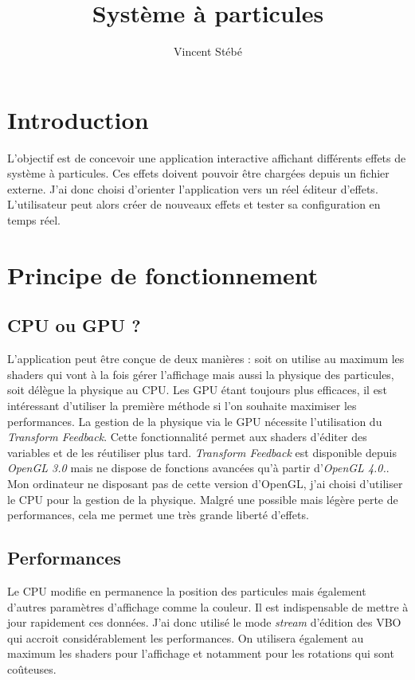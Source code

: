 \documentclass[a4paper,10pt]{article}
\title{Système à particules}
\author{Vincent Stébé}
\date{}
\begin{document}
\maketitle

\tableofcontents
\newpage
\section{Introduction}
L'objectif est de concevoir une application interactive affichant différents effets de système à particules.
Ces effets doivent pouvoir être chargées depuis un fichier externe.
J'ai donc choisi d'orienter l'application vers un réel éditeur d'effets.
L'utilisateur peut alors créer de nouveaux effets et tester sa configuration en temps réel.

\section{Principe de fonctionnement}
\subsection{CPU ou GPU ?}
L'application peut être conçue de deux manières : soit on utilise au maximum les shaders qui vont à la fois gérer l'affichage mais aussi la physique des particules,
soit délègue la physique au CPU. Les GPU étant toujours plus efficaces, il est intéressant d'utiliser la première méthode si l'on souhaite maximiser les performances.
La gestion de la physique via le GPU nécessite l'utilisation du \emph{Transform Feedback}.
Cette fonctionnalité permet aux shaders d'éditer des variables et de les réutiliser plus tard.
\emph{Transform Feedback} est disponible depuis \emph{OpenGL 3.0} mais ne dispose de fonctions avancées qu'à partir d'\emph{OpenGL 4.0.}.
Mon ordinateur ne disposant pas de cette version d'OpenGL, j'ai choisi d'utiliser le CPU pour la gestion de la physique.
Malgré une possible mais légère perte de performances, cela me permet une très grande liberté d'effets.


\subsection{Performances}
Le CPU modifie en permanence la position des particules mais également d'autres paramètres d'affichage comme la couleur.
Il est indispensable de mettre à jour rapidement ces données.
J'ai donc utilisé le mode \emph{stream} d'édition des VBO qui accroit considérablement les performances.
On utilisera également au maximum les shaders pour l'affichage et notamment pour les rotations qui sont coûteuses.
\end{document}
